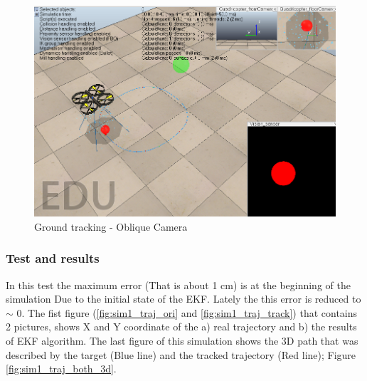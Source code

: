 \begin{figure}[ht]
	\centering
	\includegraphics[width=0.65\linewidth]{../Images/c3/ground_tracking_scene_vertical}
	\caption{Ground tracking - Oblique Camera}
	\label{fig:ground_tracking_scene_vertical}
\end{figure}

\subsubsection{Test and results}

	In this test the maximum error (That is about 1 cm) is at the beginning of the simulation Due to the initial state of the EKF. Lately the this error is reduced to $\sim$ 0. The fist figure (\ref{fig:sim1_traj_ori} and \ref{fig:sim1_traj_track}) that contains 2 pictures, shows X and Y coordinate of the a) real trajectory and b) the results of EKF algorithm. The last figure of this simulation shows the 3D path that was described by the target (Blue line) and the tracked trajectory (Red line); Figure \ref{fig:sim1_traj_both_3d}.
	
